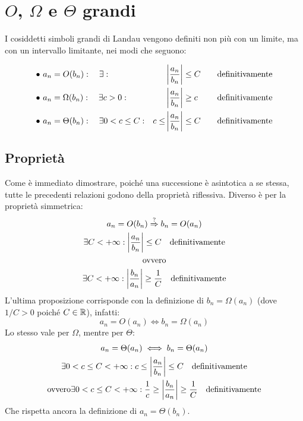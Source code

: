 \section{\texorpdfstring{$O$, $\Omega$ e $\Theta$}{O, Omega e Theta} grandi}
I cosiddetti simboli grandi di Landau vengono definiti non più con un limite, ma con un intervallo limitante, nei modi che seguono:
\begin{defin}
	\begin{align*}
		\bullet~ & a_n=O(b_n):\quad\exists:                &       & \left\lvert \frac{a_n}{b_n} \right\rvert\leq C\quad & \text{definitivamente} \\
		\bullet~ & a_n=\Omega(b_n):\quad\exists c>0:       &       & \left\lvert \frac{a_n}{b_n} \right\rvert\geq c\quad & \text{definitivamente} \\
		\bullet~ & a_n=\Theta(b_n):\quad\exists 0<c\leq C: & c\leq & \left\lvert \frac{a_n}{b_n} \right\rvert\leq C\quad & \text{definitivamente}
	\end{align*}
\end{defin}

\subsection{Proprietà}
Come è immediato dimostrare, poiché una successione è asintotica a se stessa, tutte le precedenti relazioni godono della proprietà riflessiva. Diverso è per la proprietà simmetrica:
\begin{gather*}
	a_n=O(b_n)\overset{?}{\Rightarrow} b_n=O(a_n)\\
	\exists C<+\infty: \left\lvert \frac{a_n}{b_n} \right\rvert\leq C\quad\text{definitivamente}\\
	\text{ovvero}\\
	\exists C<+\infty: \left\lvert \frac{b_n}{a_n} \right\rvert\geq \frac{1}{C}\quad\text{definitivamente}
\end{gather*}
L'ultima proposizione corrisponde con la definizione di $b_n=\Omega(a_n)$ (dove $1/C>0$ poiché $C\in\mathbb{R}$), infatti:
\[
	a_n=O(a_n)\iff b_n=\Omega(a_n)
\]
Lo stesso vale per $\Omega$, mentre per $\Theta$:
\begin{gather*}
	a_n=\Theta(a_n)\iff b_n=\Theta(a_n)\\
	\exists 0<c\leq C<+\infty: c\leq\left\lvert \frac{a_n}{b_n} \right\rvert\leq C\quad\text{definitivamente}\\
	\text{ovvero}
	\exists 0<c\leq C<+\infty: \frac{1}{c}\geq\left\lvert \frac{b_n}{a_n} \right\rvert\geq\frac{1}{C}\quad\text{definitivamente}
\end{gather*}
Che rispetta ancora la definizione di $a_n=\Theta(b_n)$.

